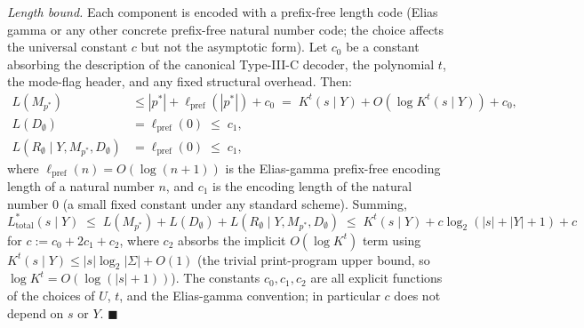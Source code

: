 \documentclass[
]{article}
\begin{document}
\emph{Length bound.} Each component is encoded with a prefix-free
length code (Elias gamma or any other concrete prefix-free natural
number code; the choice affects the universal constant $c$ but not
the asymptotic form). Let $c_0$ be a constant absorbing the
description of the canonical Type-III-C decoder, the polynomial $t$,
the mode-flag header, and any fixed structural overhead. Then:
\begin{align*}
  L(M_{p^*}) &\leq |p^*| + \ell_{\mathrm{pref}}(|p^*|) + c_0
    \;=\; K^t(s \mid Y) + O(\log K^t(s \mid Y)) + c_0, \\
  L(D_\emptyset) &= \ell_{\mathrm{pref}}(0) \;\leq\; c_1, \\
  L(R_\emptyset \mid Y, M_{p^*}, D_\emptyset) &= \ell_{\mathrm{pref}}(0)
    \;\leq\; c_1,
\end{align*}
where $\ell_{\mathrm{pref}}(n) = O(\log(n+1))$ is the Elias-gamma
prefix-free encoding length of a natural number $n$, and $c_1$ is the
encoding length of the natural number $0$ (a small fixed constant
under any standard scheme). Summing,
\[
  L^*_{\mathrm{total}}(s \mid Y)
  \;\leq\; L(M_{p^*}) + L(D_\emptyset) + L(R_\emptyset \mid Y, M_{p^*}, D_\emptyset)
  \;\leq\; K^t(s \mid Y) + c\log_2(|s|+|Y|+1) + c
\]
for $c := c_0 + 2 c_1 + c_2$, where $c_2$ absorbs the implicit
$O(\log K^t)$ term using $K^t(s \mid Y) \leq |s| \log_2 |\Sigma| + O(1)$
(the trivial print-program upper bound, so $\log K^t = O(\log(|s|+1))$).
The constants $c_0, c_1, c_2$ are all explicit functions of the
choices of $U$, $t$, and the Elias-gamma convention; in particular
$c$ does not depend on $s$ or $Y$.
\hfill$\blacksquare$
\end{document}
